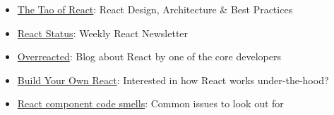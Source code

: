 \begin{itemize}[leftmargin=*]
    \item
        \href{https://alexkondov.com/tao-of-react/}{The Tao of React}:
        React Design, Architecture \& Best Practices

    \item
        \href{http://react.statuscode.com/}{React Status}:
        Weekly React Newsletter

    \item
        \href{https://overreacted.io}{Overreacted}:
        Blog about React by one of the core developers

    \item
        \href{https://pomb.us/build-your-own-react/}{Build Your Own React}:
        Interested in how React works under-the-hood?

    \item
        \href{https://antongunnarsson.com/react-component-code-smells/}{React component code smells}:
        Common issues to look out for
\end{itemize}
